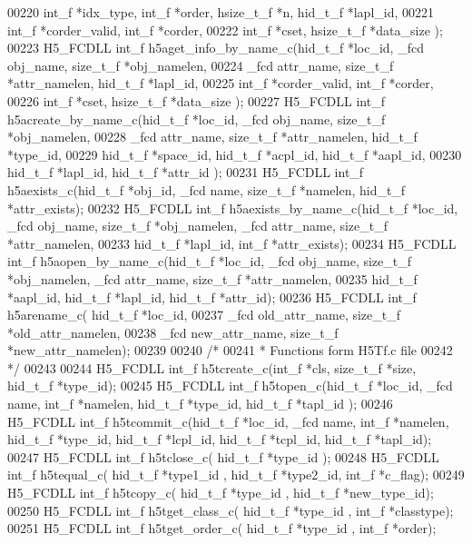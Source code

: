 \begin{DoxyCode}
00220                       int\_f *idx\_type, int\_f *order, hsize\_t\_f *n, hid\_t\_f *lapl\_id,
00221                       int\_f *corder\_valid, int\_f *corder,
00222                       int\_f *cset, hsize\_t\_f *data\_size );
00223 H5\_FCDLL int\_f h5aget\_info\_by\_name\_c(hid\_t\_f *loc\_id, \_fcd obj\_name, size\_t\_f *obj\_namelen,
00224                        \_fcd attr\_name, size\_t\_f *attr\_namelen, hid\_t\_f *lapl\_id,
00225                        int\_f *corder\_valid, int\_f *corder,
00226                        int\_f *cset, hsize\_t\_f *data\_size );
00227 H5\_FCDLL int\_f h5acreate\_by\_name\_c(hid\_t\_f *loc\_id, \_fcd obj\_name, size\_t\_f *obj\_namelen,
00228                     \_fcd attr\_name, size\_t\_f *attr\_namelen,  hid\_t\_f *type\_id,
00229                     hid\_t\_f *space\_id, hid\_t\_f *acpl\_id, hid\_t\_f *aapl\_id,
00230                     hid\_t\_f *lapl\_id, hid\_t\_f *attr\_id );
00231 H5\_FCDLL int\_f h5aexists\_c(hid\_t\_f *obj\_id, \_fcd name, size\_t\_f *namelen, hid\_t\_f *attr\_exists);
00232 H5\_FCDLL int\_f h5aexists\_by\_name\_c(hid\_t\_f *loc\_id, \_fcd obj\_name, size\_t\_f *obj\_namelen, \_fcd attr\_name, 
      size\_t\_f *attr\_namelen,
00233               hid\_t\_f *lapl\_id, int\_f *attr\_exists);
00234 H5\_FCDLL int\_f h5aopen\_by\_name\_c(hid\_t\_f *loc\_id, \_fcd obj\_name, size\_t\_f *obj\_namelen, \_fcd attr\_name, 
      size\_t\_f *attr\_namelen,
00235                    hid\_t\_f *aapl\_id, hid\_t\_f *lapl\_id, hid\_t\_f *attr\_id);
00236 H5\_FCDLL int\_f h5arename\_c( hid\_t\_f *loc\_id,
00237               \_fcd old\_attr\_name, size\_t\_f *old\_attr\_namelen,
00238               \_fcd new\_attr\_name, size\_t\_f *new\_attr\_namelen);
00239 
00240 \textcolor{comment}{/*}
00241 \textcolor{comment}{ * Functions form H5Tf.c file}
00242 \textcolor{comment}{ */}
00243 
00244 H5\_FCDLL int\_f h5tcreate\_c(int\_f *cls, size\_t\_f *size, hid\_t\_f *type\_id);
00245 H5\_FCDLL int\_f h5topen\_c(hid\_t\_f *loc\_id, \_fcd name, int\_f *namelen, hid\_t\_f *type\_id, hid\_t\_f *tapl\_id );
00246 H5\_FCDLL int\_f h5tcommit\_c(hid\_t\_f *loc\_id, \_fcd name, int\_f *namelen, hid\_t\_f *type\_id, hid\_t\_f *lcpl\_id, 
      hid\_t\_f *tcpl\_id, hid\_t\_f *tapl\_id);
00247 H5\_FCDLL int\_f h5tclose\_c( hid\_t\_f *type\_id );
00248 H5\_FCDLL int\_f h5tequal\_c( hid\_t\_f *type1\_id , hid\_t\_f *type2\_id, int\_f *c\_flag);
00249 H5\_FCDLL int\_f h5tcopy\_c( hid\_t\_f *type\_id , hid\_t\_f *new\_type\_id);
00250 H5\_FCDLL int\_f h5tget\_class\_c( hid\_t\_f *type\_id , int\_f *classtype);
00251 H5\_FCDLL int\_f h5tget\_order\_c( hid\_t\_f *type\_id , int\_f *order);

\end{DoxyCode}
